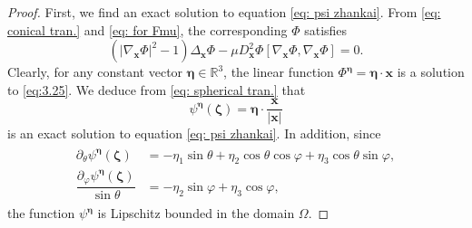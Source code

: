 \documentclass[10pt,a4paper]{amsart}
\begin{document}
\begin{proof}
	 First, we find an exact solution to equation \eqref{eq: psi zhankai}. From \eqref{eq: conical tran.} and \eqref{eq: for Fmu}, the corresponding $\Phi$ satisfies
	\begin{equation}\label{eq:3.25}
		(|\nabla_{\bm{x}}\Phi|^2-1)\Delta_{\bm{x}}\Phi-\mu D^2_{\bm{x}}\Phi[\nabla_{\bm{x}}\Phi,\nabla_{\bm{x}}\Phi]=0.
	\end{equation}
     Clearly, for any constant vector $\bm{\eta}\in \mathbb{R}^{3}$, the linear function $\Phi^{\bm{\eta}}=\bm{\eta}\cdot\bm{x}$ is a solution to \eqref{eq:3.25}. We deduce from \eqref{eq: spherical tran.} that
	\begin{equation}\label{eq:3.26}
		{\psi}^{\bm{\eta}}(\bm{\zeta})=\bm{\eta}\cdot\frac{\bm{x}}{|\bm{x}|}
	\end{equation}
	is an exact solution to equation \eqref{eq: psi zhankai}. In addition, since
	\begin{align}\label{eq: d phi first}
            \begin{split}
	    \partial_\theta {\psi}^{\bm{\eta}}(\bm{\zeta})&=-\eta_1\sin\theta+\eta_2\cos\theta\cos\varphi+\eta_3\cos\theta\sin\varphi,\\
            \dfrac{\partial_\varphi {\psi}^{\bm{\eta}}(\bm{\zeta})}{\sin\theta}&=-\eta_2 \sin\varphi+\eta_3\cos\varphi,
            \end{split}
	\end{align}	
    the function ${\psi}^{\bm{\eta}}$ is Lipschitz bounded in the domain $\Omega$.
    

\end{proof}
\end{document}
